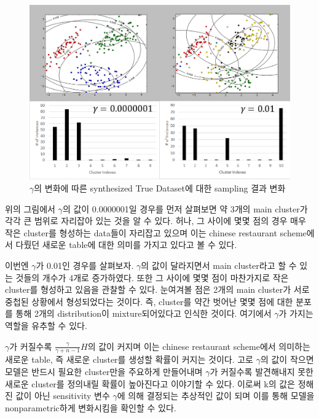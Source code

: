 \documentclass[a4paper]{oblivoir}
\begin{document}
\begin{figure}[ht] \centering 
\begin{center}
\includegraphics[scale=0.6]{fig13_10.png} 
\caption{$\gamma$의 변화에 따른 synthesized True Dataset에 대한 sampling 결과 변화}
\label{fig:13-9}
\end{center}
\end{figure}


위의 그림에서 $\gamma$의 값이 0.0000001일 경우를 먼저 살펴보면 약 3개의 main cluster가 각각 큰 범위로 자리잡아 있는 것을 알 수 있다. 허나, 그 사이에 몇몇 점의 경우 매우 작은 cluster를 형성하는 data들이 자리잡고 있으며 이는 chinese restaurant scheme에서 다뤘던 새로운 table에 대한 의미를 가지고 있다고 볼 수 있다. 

이번엔 $\gamma$가 0.01인 경우를 살펴보자. $\gamma$의 값이 달라지면서 main cluster라고 할 수 있는 것들의 개수가 4개로 증가하였다. 또한 그 사이에 몇몇 점이 마찬가지로 작은 cluster를 형성하고 있음을 관찰할 수 있다. 눈여겨볼 점은 2개의 main cluster가 서로 중첩된 상황에서 형성되었다는 것이다. 즉, cluster를 약간 벗어난 몇몇 점에 대한 분포를 통해 2개의 distribution이 mixture되어있다고 인식한 것이다. 여기에서 $\gamma$가 가지는 역할을 유추할 수 있다.

$\gamma$가 커질수록 $\frac{\gamma}{\gamma+n-1}H$의 값이 커지며 이는 chinese restaurant scheme에서 의미하는 새로운 table, 즉 새로운 cluster를 생성할 확률이 커지는 것이다. 고로 $\gamma$의 값이 작으면 모델은 반드시 필요한 cluster만을 주요하게 만들어내며 $\gamma$가 커질수록 발견해내지 못한 새로운 cluster를 정의내릴 확률이 높아진다고 이야기할 수 있다. 이로써 k의 값은 정해진 값이 아닌 sensitivity 변수 $\gamma$에 의해 결정되는 추상적인 값이 되며 이를 통해 모델을 nonparametric하게 변화시킴을 확인할 수 있다. 
\end{document}

